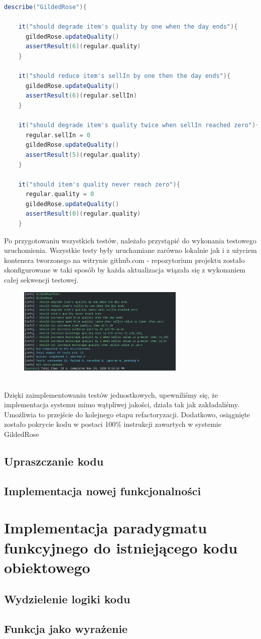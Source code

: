 \documentclass[a4paper, 11pt]{article}
\begin{document}
\begin{lstlisting}[language=scala]
  describe("GildedRose"){

    it("should degrade item's quality by one when the day ends"){
      gildedRose.updateQuality()
      assertResult(6)(regular.quality)
    }

    it("should reduce item's sellIn by one then the day ends"){
      gildedRose.updateQuality()
      assertResult(6)(regular.sellIn)
    }

    it("should degrade item's quality twice when sellIn reached zero"){
      regular.sellIn = 0
      gildedRose.updateQuality()
      assertResult(5)(regular.quality)
    }

    it("should item's quality never reach zero"){
      regular.quality = 0
      gildedRose.updateQuality()
      assertResult(0)(regular.quality)
    }
\end{lstlisting}
Po przygotowaniu wszystkich testów, należało przystąpić do wykonania testowego uruchomienia. Wszystkie testy były uruchamiane zarówno lokalnie jak i z użyciem kontenera tworzonego na witrynie github.com - repozytorium projektu zostało skonfigurowane w taki sposób by każda aktualizacja wiązała się z wykonaniem całej sekwencji testowej.
\begin{figure}[!tbh]
\includegraphics[width=8cm]{tests}
\centering
\end{figure}\\
Dzięki zaimplementowaniu testów jednostkowych, upewniliśmy się, że implementacja systemu mimo wątpliwej jakości, działa tak jak zakładaliśmy. Umożliwia to przejście do kolejnego etapu refactoryzacji.
Dodatkowo, osiągnięte zostało pokrycie kodu w postaci 100\% instrukcji zawartych w systemie GildedRose
\subsection{Upraszczanie kodu}
\subsection{Implementacja nowej funkcjonalności}
\section{Implementacja paradygmatu funkcyjnego do istniejącego kodu obiektowego}
\subsection{Wydzielenie logiki kodu}
\subsection{Funkcja jako wyrażenie}
\end{document}
